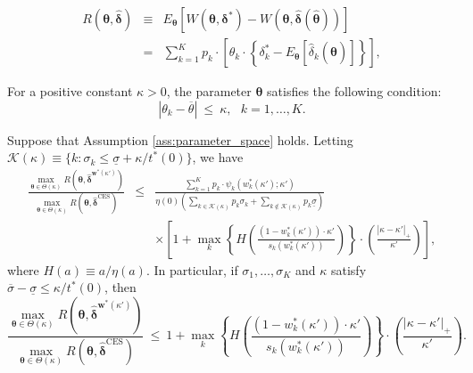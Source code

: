 \documentclass[10pt,a4paper]{amsart}
\begin{document}
\begin{eqnarray}
R(\bm{\theta},\hat{\bm{\delta}}) & \equiv & E_{\bm{\theta}} \left[ W(\bm{\theta}, \bm{\delta}^*) - W(\bm{\theta}, \hat{\bm{\delta}}(\hat{\bm{\theta}})) \right] \nonumber \\
&=& \sum_{k=1}^K p_k \cdot \left[ \theta_k \cdot \left\{ \delta_k^* - E_{\bm{\theta}}[\hat{\delta}_k(\hat{\bm{\theta}})] \right\} \right], \label{regret}
\end{eqnarray}

\begin{Assumption}\label{ass:parameter_space}
For a positive constant $\kappa > 0$, the parameter $\bm{\theta}$ satisfies the following condition:
$$
\left| \theta_k - \overline{\theta} \right| \ \leq \ \kappa, \ \ \ k = 1, \ldots, K.
$$
\end{Assumption}

\begin{Lemma}\label{lem:CES_mis}
Suppose that Assumption \ref{ass:parameter_space} holds. Letting $\mathcal{K}(\kappa) \equiv \{k : \sigma_k \leq \underline{\sigma} + \kappa / t^{\ast}(0)\}$, we have
\begin{eqnarray}
\frac{\max_{\bm{\theta} \in \Theta(\kappa)} R(\bm{\theta},\hat{\bm{\delta}}^{\bm{w}^{\ast}(\kappa')})}{\max_{\bm{\theta} \in \Theta(\kappa)} R(\bm{\theta},\hat{\bm{\delta}}^{\mathrm{CES}})} & \leq & \frac{\sum_{k=1}^K p_k \cdot \psi_k\left( w_k^{\ast}(\kappa') ;\kappa' \right)}{\eta(0) \left( \sum_{k \in \mathcal{K}(\kappa)} p_k \sigma_k + \sum_{k \not\in \mathcal{K}(\kappa)} p_k \underline{\sigma} \right)} \nonumber \\
& &\times \left[ 1 + \max_{k} \left\{ H \left( \frac{(1-w_k^{\ast}(\kappa')) \cdot \kappa' }{s_k \left( w_k^{\ast}(\kappa') \right)} \right) \right\} \cdot \left( \frac{|\kappa - \kappa'|_{+}}{\kappa'} \right) \right], \label{Thm_CES_mis}
\end{eqnarray}
where $H(a) \equiv a/\eta(a)$. In particular, if $\sigma_1, \ldots, \sigma_K$ and $\kappa$ satisfy $\overline{\sigma} - \underline{\sigma} \leq \kappa / t^{\ast}(0)$, then
\[
\frac{\max_{\bm{\theta} \in \Theta(\kappa)} R(\bm{\theta},\hat{\bm{\delta}}^{\bm{w}^{\ast}(\kappa')})}{\max_{\bm{\theta} \in \Theta(\kappa)} R(\bm{\theta},\hat{\bm{\delta}}^{\mathrm{CES}})} \ \leq \ 1 + \max_{k} \left\{ H \left( \frac{(1-w_k^{\ast}(\kappa')) \cdot \kappa' }{s_k \left( w_k^{\ast}(\kappa') \right)} \right) \right\} \cdot \left( \frac{|\kappa - \kappa'|_{+}}{\kappa'} \right).
\]
\end{Lemma}
\end{document}
